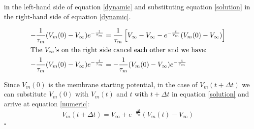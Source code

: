 \documentclass{scrartcl}
\begin{document}
in the left-hand side of equation \ref{dynamic} and substituting equation \ref{solution} in the right-hand side of equation \ref{dynamic}.

\begin{align*}
-\frac{1}{\tau_m}(V_m(0) - V_\infty) e^{-\frac{t}{\tau_m}} &= \frac{1}{\tau_m}\left[ V_\infty - V_\infty - e^{-\frac{t}{\tau_m}}(V_m(0) - V_\infty)\right]\\
\shortintertext{The $V_\infty$'s on the right side cancel each other and we have:}
-\frac{1}{\tau_m}(V_m(0) - V_\infty) e^{-\frac{t}{\tau_m}} &= -\frac{1}{\tau_m}(V_m(0) - V_\infty) e^{-\frac{t}{\tau_m}}
\end{align*}

Since $V_m(0)$ is the membrane starting potential, in the case of $V_m(t+\Delta t)$ we can substitute $V_m(0)$ with $V_m(t)$ and $t$ with $t + \Delta t$ in equation \ref{solution} and arrive at equation \ref{numeric}:
\begin{equation*}
V_m(t+\Delta t) = V_\infty + e^{-\frac{\Delta t}{\tau_m}}\left( V_m(t) -V_\infty\right)
\end{equation*}
\hfill $\square$
\end{document}
